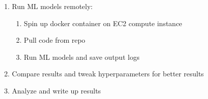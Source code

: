 \documentclass[11pt]{article}
\begin{document}
\begin{enumerate}
	\item Run ML models remotely:

		\begin{enumerate}
			\item Spin up docker container on EC2 compute instance
			\item Pull code from repo
			\item Run ML models and save output logs
		\end{enumerate}
		
	\item Compare results and tweak hyperparameters for better results
	\item Analyze and write up results
\end{enumerate}


{}

\end{document}

